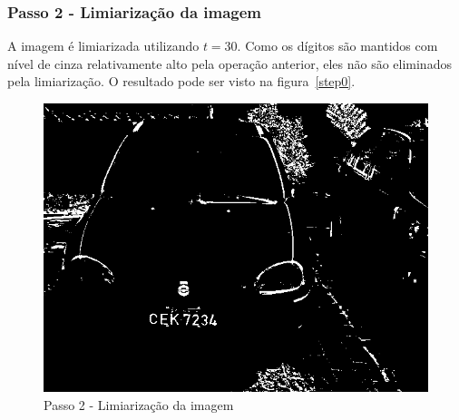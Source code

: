 \documentclass[11pt]{article} %
\begin{document}
\subsubsection{Passo 2 - Limiarização da imagem}
	A imagem é limiarizada utilizando $t = 30$. Como os dígitos são mantidos com nível de cinza relativamente alto pela operação anterior, eles não são eliminados pela limiarização. O resultado pode ser visto na figura~\ref{step0}.
	\begin{figure}[!h]
		\begin{center}
		\includegraphics[scale=0.5]{img_relatorio/step1.png}
		\caption{Passo 2 - Limiarização da imagem}\label{step1}
		\end{center}
	\end{figure}
\newpage
\end{document}
